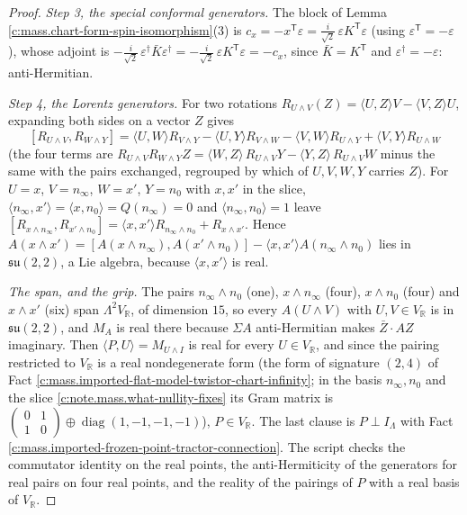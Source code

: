 \documentclass[11pt]{article}
\theoremstyle{definition}
\theoremstyle{plain}
\providecommand{\R}{}\renewcommand{\R}{\mathbb{R}}
\providecommand{\ip}{}\renewcommand{\ip}[2]{\langle #1, #2\rangle}
\begin{document}
\begin{proof}
\emph{Step 3, the special conformal generators.} The block of Lemma \ref{c:mass.chart-form-spin-isomorphism}(3) is $c_{x} = -x^{\mathsf T}\varepsilon = \tfrac{i}{\sqrt2}\,\varepsilon K^{\mathsf T}\varepsilon$ (using $\varepsilon^{\mathsf T} = -\varepsilon$), whose adjoint is $-\tfrac{i}{\sqrt2}\,\varepsilon^{\dagger}\bar{K}\varepsilon^{\dagger} = -\tfrac{i}{\sqrt2}\,\varepsilon K^{\mathsf T}\varepsilon = -c_{x}$, since $\bar K = K^{\mathsf T}$ and $\varepsilon^{\dagger} = -\varepsilon$: anti-Hermitian.

\emph{Step 4, the Lorentz generators.} For two rotations $R_{U\wedge V}(Z) = \ip{U}{Z}V - \ip{V}{Z}U$, expanding both sides on a vector $Z$ gives
\[
[R_{U\wedge V}, R_{W\wedge Y}] = \ip{U}{W}R_{V\wedge Y} - \ip{U}{Y}R_{V\wedge W} - \ip{V}{W}R_{U\wedge Y} + \ip{V}{Y}R_{U\wedge W}
\]
(the four terms are $R_{U\wedge V}R_{W\wedge Y}Z = \ip{W}{Z}\,R_{U\wedge V}Y - \ip{Y}{Z}\,R_{U\wedge V}W$ minus the same with the pairs exchanged, regrouped by which of $U, V, W, Y$ carries $Z$). For $U = x$, $V = n_{\infty}$, $W = x'$, $Y = n_{0}$ with $x, x'$ in the slice, $\ip{n_{\infty}}{x'} = \ip{x}{n_{0}} = Q(n_{\infty}) = 0$ and $\ip{n_{\infty}}{n_{0}} = 1$ leave $[R_{x\wedge n_{\infty}}, R_{x'\wedge n_{0}}] = \ip{x}{x'}R_{n_{\infty}\wedge n_{0}} + R_{x\wedge x'}$. Hence $A(x\wedge x') = [A(x\wedge n_{\infty}), A(x'\wedge n_{0})] - \ip{x}{x'}A(n_{\infty}\wedge n_{0})$ lies in $\mathfrak{su}(2,2)$, a Lie algebra, because $\ip{x}{x'}$ is real.

\emph{The span, and the grip.} The pairs $n_{\infty}\wedge n_{0}$ (one), $x\wedge n_{\infty}$ (four), $x\wedge n_{0}$ (four) and $x\wedge x'$ (six) span $\Lambda^{2}V_{\R}$, of dimension $15$, so every $A(U\wedge V)$ with $U, V \in V_{\R}$ is in $\mathfrak{su}(2,2)$, and $M_{A}$ is real there because $\Sigma A$ anti-Hermitian makes $\bar{Z}\cdot AZ$ imaginary. Then $\ip{P}{U} = M_{U\wedge I}$ is real for every $U \in V_{\R}$, and since the pairing restricted to $V_{\R}$ is a real nondegenerate form (the form of signature $(2,4)$ of Fact \ref{c:mass.imported-flat-model-twistor-chart-infinity}; in the basis $n_{\infty}, n_{0}$ and the slice \ref{c:note.mass.what-nullity-fixes} its Gram matrix is $\left(\begin{smallmatrix} 0 & 1 \\ 1 & 0\end{smallmatrix}\right) \oplus \operatorname{diag}(1,-1,-1,-1)$), $P \in V_{\R}$. The last clause is $P \perp I_{\Lambda}$ with Fact \ref{c:mass.imported-frozen-point-tractor-connection}. The script checks the commutator identity on the real points, the anti-Hermiticity of the generators for real pairs on four real points, and the reality of the pairings of $P$ with a real basis of $V_{\R}$.

\end{proof}
\end{document}

